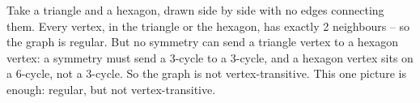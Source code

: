 \documentclass[11pt]{article}
\begin{document}
Take a triangle and a hexagon, drawn side by side with no edges connecting them.
Every vertex, in the triangle or the hexagon, has exactly 2 neighbours -- so the graph is regular.
But no symmetry can send a triangle vertex to a hexagon vertex: a symmetry must send a 3-cycle to a 3-cycle, and a hexagon vertex sits on a 6-cycle, not a 3-cycle. So the graph is not vertex-transitive.
This one picture is enough: regular, but not vertex-transitive.
\end{document}
